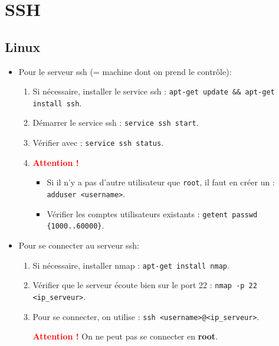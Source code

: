 \documentclass[a4paper]{article}
\renewcommand{\tt}{\texttt}
\begin{document}
\section{SSH}










\subsection{Linux} \label{subsec:LinuxSSH}





\begin{itemize}





\item Pour le serveur ssh (= machine dont on prend le contrôle):
\begin{enumerate}
    \item Si nécessaire, installer le service ssh : \tt{apt-get update \&\& apt-get install ssh}.
    \item Démarrer le service ssh : \tt{service ssh start}.
    \item Vérifier avec : \tt{service ssh status}.
    \item \textcolor{red}{\textbf{Attention !}}
    \begin{itemize}
        \item Si il n'y a pas d'autre utilisateur que \tt{root}, il faut en créer un : \tt{adduser <username>}.
        \item Vérifier les comptes utilisateurs existants : \tt{getent passwd \{1000..60000\}}.
    \end{itemize}
\end{enumerate}





\item Pour se connecter au serveur ssh:
\begin{enumerate}
    \item Si nécessaire, installer nmap : \tt{apt-get install nmap}.
    \item Vérifier que le serveur écoute bien sur le port 22 : \tt{nmap -p 22 <ip\_serveur>}.
    \item Pour se connecter, on utilise : \tt{ssh <username>@<ip\_serveur>}.
    \begin{example}
        \textcolor{red}{\textbf{Attention !}} On ne peut pas se connecter en \textbf{root}.
    \end{example}
\end{enumerate}





\end{itemize}
\end{document}
